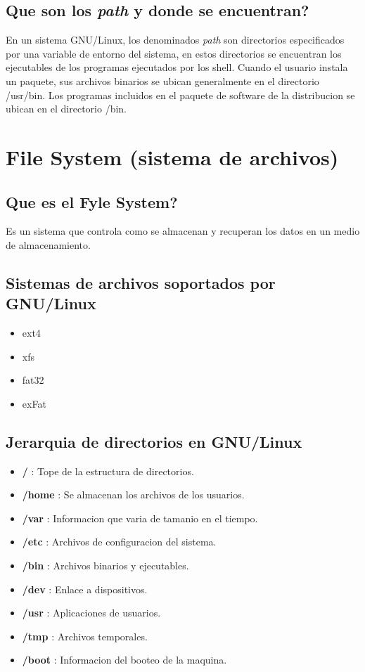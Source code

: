 \documentclass[11pt]{article}
\begin{document}
\subsection{Que son los \textit{path} y donde se encuentran?}
En un sistema GNU/Linux, los denominados \textit{path} son directorios especificados por una variable de entorno del sistema, en estos directorios se encuentran los ejecutables de los programas ejecutados por los shell.
Cuando el usuario instala un paquete, sus archivos binarios se ubican generalmente en el directorio /usr/bin. Los programas incluidos en el paquete de software de la distribucion se ubican en el directorio /bin.

\section{File System (sistema de archivos)}
\subsection{Que es el Fyle System?}
Es un sistema que controla como se almacenan y recuperan los datos en un medio de almacenamiento.

\subsection{Sistemas de archivos soportados por GNU/Linux}
\begin{itemize}
    \item ext4
    \item xfs
    \item fat32
    \item exFat
\end{itemize}

\subsection{Jerarquia de directorios en GNU/Linux}
\begin{itemize}
    \item \textbf{/} : Tope de la estructura de directorios.
    \item \textbf{/home} : Se almacenan los archivos de los usuarios.
    \item \textbf{/var} : Informacion que varia de tamanio en el tiempo.
    \item \textbf{/etc} : Archivos de configuracion del sistema.
    \item \textbf{/bin} : Archivos binarios y ejecutables.
    \item \textbf{/dev} : Enlace a dispositivos.
    \item \textbf{/usr} : Aplicaciones de usuarios.
    \item \textbf{/tmp} : Archivos temporales.
    \item \textbf{/boot} : Informacion del booteo de la maquina.
\end{itemize}
\end{document}
